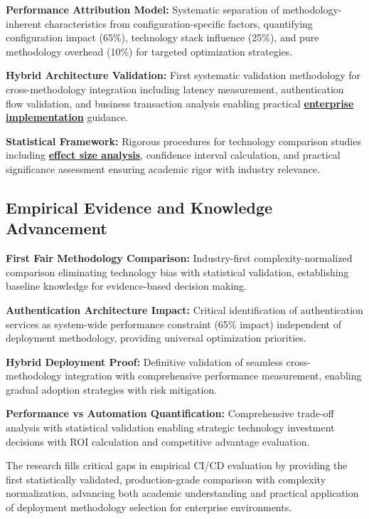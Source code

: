 \textbf{Performance Attribution Model:} Systematic separation of methodology-inherent characteristics from configuration-specific factors, quantifying configuration impact (65\%), technology stack influence (25\%), and pure methodology overhead (10\%) for targeted optimization strategies.

\textbf{Hybrid Architecture Validation:} First systematic validation methodology for cross-methodology integration including latency measurement, authentication flow validation, and business transaction analysis enabling practical \textbf{\hyperref[enterprise_technology_adoption]{enterprise implementation}} guidance.

\textbf{Statistical Framework:} Rigorous procedures for technology comparison studies including \textbf{\hyperref[cohen1988statistical]{effect size analysis}}, confidence interval calculation, and practical significance assessment ensuring academic rigor with industry relevance.

\subsection{Empirical Evidence and Knowledge Advancement}
\label{subsec:empirical_evidence}

\textbf{First Fair Methodology Comparison:} Industry-first complexity-normalized comparison eliminating technology bias with statistical validation, establishing baseline knowledge for evidence-based decision making.

\textbf{Authentication Architecture Impact:} Critical identification of authentication services as system-wide performance constraint (65\% impact) independent of deployment methodology, providing universal optimization priorities.

\textbf{Hybrid Deployment Proof:} Definitive validation of seamless cross-methodology integration with comprehensive performance measurement, enabling gradual adoption strategies with risk mitigation.

\textbf{Performance vs Automation Quantification:} Comprehensive trade-off analysis with statistical validation enabling strategic technology investment decisions with ROI calculation and competitive advantage evaluation.

The research fills critical gaps in empirical CI/CD evaluation by providing the first statistically validated, production-grade comparison with complexity normalization, advancing both academic understanding and practical application of deployment methodology selection for enterprise environments.

